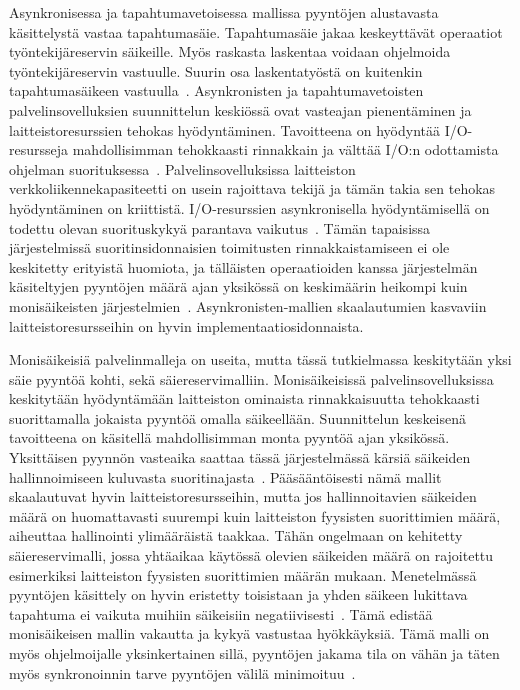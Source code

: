 \documentclass[12pt]{article}
\begin{document}
Asynkronisessa ja tapahtumavetoisessa mallissa pyyntöjen alustavasta käsittelystä
vastaa tapahtumasäie. Tapahtumasäie jakaa keskeyttävät operaatiot
työntekijäreservin säikeille. Myös raskasta laskentaa voidaan 
ohjelmoida työntekijäreservin vastuulle. Suurin osa laskentatyöstä
on kuitenkin tapahtumasäikeen vastuulla~\cite{pai_flash:_nodate}.
Asynkronisten ja tapahtumavetoisten palvelinsovelluksien suunnittelun keskiössä
ovat vasteajan pienentäminen ja laitteistoresurssien tehokas hyödyntäminen. 
Tavoitteena on hyödyntää I/O-resursseja mahdollisimman tehokkaasti
rinnakkain ja välttää I/O:n odottamista ohjelman suorituksessa~\cite{pai_flash:_nodate}. Palvelinsovelluksissa
laitteiston verkkoliikennekapasiteetti on usein rajoittava tekijä ja tämän takia
sen tehokas hyödyntäminen on kriittistä. I/O-resurssien asynkronisella hyödyntämisellä on todettu
olevan suorituskykyä parantava vaikutus~\cite{hu_applying_1998}.
Tämän tapaisissa järjestelmissä suoritinsidonnaisien
toimitusten rinnakkaistamiseen ei ole keskitetty erityistä huomiota, ja tälläisten operaatioiden
kanssa järjestelmän käsiteltyjen pyyntöjen määrä ajan yksikössä on keskimäärin heikompi
kuin monisäikeisten järjestelmien~\cite{davis_case_2017}.
Asynkronisten-mallien skaalautumien kasvaviin laitteistoresursseihin on hyvin
implementaatiosidonnaista.

Monisäikeisiä palvelinmalleja on useita, mutta tässä tutkielmassa keskitytään
yksi säie pyyntöä kohti, sekä säiereservimalliin.
Monisäikeisissä palvelinsovelluksissa keskitytään hyödyntämään laitteiston ominaista
rinnakkaisuutta tehokkaasti suorittamalla jokaista pyyntöä omalla säikeellään. Suunnittelun keskeisenä
tavoitteena on käsitellä mahdollisimman monta pyyntöä ajan yksikössä. Yksittäisen pyynnön
vasteaika saattaa tässä
järjestelmässä kärsiä säikeiden hallinnoimiseen kuluvasta suoritinajasta~\cite{easton_developing_2004}.
Pääsääntöisesti nämä mallit skaalautuvat hyvin laitteistoresursseihin,
mutta jos hallinnoitavien säikeiden määrä on huomattavasti suurempi kuin laitteiston
fyysisten suorittimien määrä, aiheuttaa hallinointi ylimääräistä taakkaa.
Tähän ongelmaan on kehitetty säiereservimalli, jossa yhtäaikaa käytössä
olevien säikeiden määrä on rajoitettu esimerkiksi laitteiston fyysisten
suorittimien määrän mukaan.
Menetelmässä pyyntöjen käsittely on hyvin eristetty toisistaan ja
yhden säikeen lukittava tapahtuma ei vaikuta muihiin säikeisiin negatiivisesti~\cite{davis_case_2017}.
Tämä edistää monisäikeisen mallin vakautta ja kykyä vastustaa hyökkäyksiä.
Tämä malli on myös ohjelmoijalle yksinkertainen sillä, pyyntöjen jakama tila
on vähän ja täten myös synkronoinnin tarve pyyntöjen välilä minimoituu~\cite{hu_applying_1998}.
\end{document}
